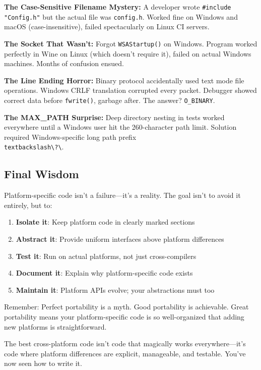 \textbf{The Case-Sensitive Filename Mystery:}
A developer wrote \texttt{\#include "Config.h"} but the actual file was \texttt{config.h}. Worked fine on Windows and macOS (case-insensitive), failed spectacularly on Linux CI servers.

\textbf{The Socket That Wasn't:}
Forgot \texttt{WSAStartup()} on Windows. Program worked perfectly in Wine on Linux (which doesn't require it), failed on actual Windows machines. Months of confusion ensued.

\textbf{The Line Ending Horror:}
Binary protocol accidentally used text mode file operations. Windows CRLF translation corrupted every packet. Debugger showed correct data before \texttt{fwrite()}, garbage after. The answer? \texttt{O\_BINARY}.

\textbf{The MAX\_PATH Surprise:}
Deep directory nesting in tests worked everywhere until a Windows user hit the 260-character path limit. Solution required Windows-specific long path prefix \texttt{\\textbackslash\textbackslash?\textbackslash}.

\subsection{Final Wisdom}

Platform-specific code isn't a failure—it's a reality. The goal isn't to avoid it entirely, but to:

\begin{enumerate}
    \item \textbf{Isolate it}: Keep platform code in clearly marked sections
    \item \textbf{Abstract it}: Provide uniform interfaces above platform differences
    \item \textbf{Test it}: Run on actual platforms, not just cross-compilers
    \item \textbf{Document it}: Explain why platform-specific code exists
    \item \textbf{Maintain it}: Platform APIs evolve; your abstractions must too
\end{enumerate}

Remember: Perfect portability is a myth. Good portability is achievable. Great portability means your platform-specific code is so well-organized that adding new platforms is straightforward.

The best cross-platform code isn't code that magically works everywhere---it's code where platform differences are explicit, manageable, and testable. You've now seen how to write it.


